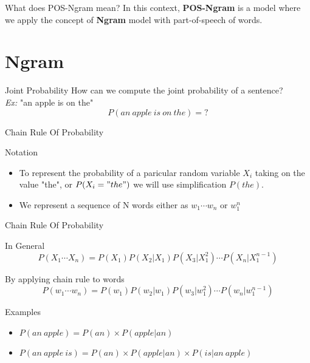 \documentclass{beamer}
\begin{document}
\begin{frame}{What does POS-Ngram mean?}
In this context, \textbf{POS-Ngram} is a model where we apply the concept of \textbf{Ngram} model with part-of-speech of words.
\end{frame}


\section{Ngram}

\begin{frame}{Joint Probability}
How can we compute the joint probability of a sentence?\\
\textit{Ex:} "an apple is on the" \\
    $$P(an\ apple\ is\ on\ the) = \text{?}$$

\end{frame}
\begin{frame}{Chain Rule Of Probability}
    \begin{block}{Notation}
        \begin{itemize}
            \item To represent the probability of a paricular random variable $X_i$ taking on the value "the", or $P(X_i="the")$ we will use simplification $P(the)$.
            \item We represent a sequence of N words either as $w_1\cdots w_n$ or $w_1^n$
        \end{itemize}
    \end{block}

\end{frame}

\begin{frame}{Chain Rule Of Probability}
    \begin{block}{In General}
        $$P(X_1\cdots X_n) = P(X_1)P(X_2|X_1)P(X_3|X_1^2)\cdots P(X_n|X_1^{n-1})$$
    \end{block}
    \begin{block}{By applying chain rule to words}
        $$P(w_1\cdots w_n) = P(w_1)P(w_2|w_1)P(w_3|w_1^2)\cdots P(w_n|w_1^{n-1})$$
    \end{block}

    \begin{block}{Examples}
        \begin{itemize}
            \item $P(an\ apple) = P(an)\times P(apple|an)$
            \item $P(an\ apple\ is) = P(an)\times P(apple| an) \times P(is | an\ apple)$
        \end{itemize}
    \end{block}

\end{frame}
\end{document}
